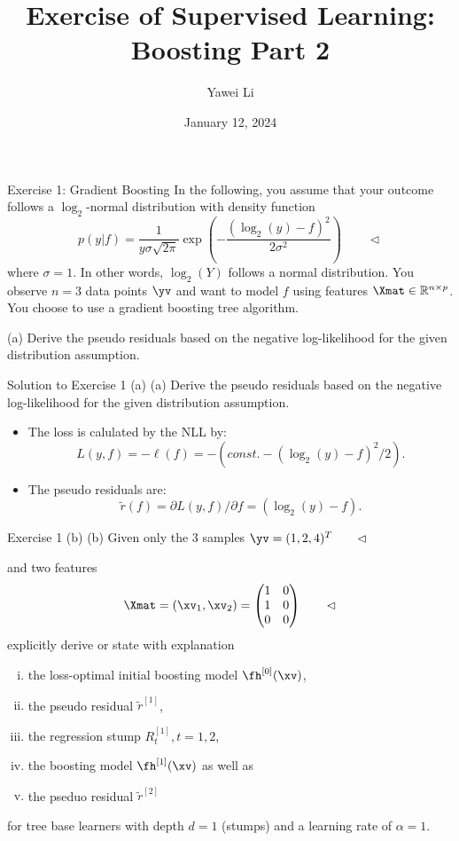\documentclass[aspectratio=169]{beamer}
\title[]{\textbf{Exercise of Supervised Learning: \\ Boosting Part 2}}
\author{Yawei Li}
\institute[LMU]
{
\\
  \texttt{yawei.li@stat.uni-muenchen.de}
}
\date{January 12, 2024}
\newcommand{\fhx}[1]{\fh^{[#1]}(\xv)}
\newcommand{\rtilde}[1]{\tilde{r}^{[#1]}}
\newcommand{\Rt}[1]{R_t^{[#1]}}
\begin{document}
\begin{frame}
\titlepage
\end{frame}

\begin{frame}{Exercise 1: Gradient Boosting}
	In the following, you assume that your outcome follows a $\log_2$-normal distribution with density function 
	$$p(y|f) = \frac{1}{y \sigma \sqrt{2\pi}} \exp\left( - \frac{(\log_2(y) - f)^2}{2\sigma^2} \right) \qquad \lhd$$ 
	where $\sigma = 1$. In other words, $\log_2(Y)$ follows a normal distribution. You observe $n = 3$ data points $\yv$ and want to model $f$ using features $\Xmat \in \mathbb{R}^{n \times p}$. You choose to use a gradient boosting tree algorithm. 
	
	(a) Derive the pseudo residuals based on the negative log-likelihood for the given distribution assumption.
\end{frame}

\begin{frame}{Solution to Exercise 1 (a)}
	(a) Derive the pseudo residuals based on the negative log-likelihood for the given distribution assumption.
	\begin{itemize}
		\item<2-> The loss is calulated by the NLL by: $$L(y, f) = - \ell(f) = - (const. - (\log_2(y) - f)^2 /2).$$
		\item<3-> The pseudo residuals are: $$\tilde{r} (f) = \partial L(y,f) / \partial f = (\log_2(y) - f).$$
	\end{itemize}
\end{frame}

\begin{frame}{Exercise 1 (b)}
	(b) Given only the 3 samples $\yv = (1, 2, 4)^T \qquad \lhd$ 
	
	and two features 
	$$\Xmat = (\xv_1, \xv_2) = 
		\begin{pmatrix}
			1 & 0 \\
			1 & 0 \\
			0 & 0 \\
		\end{pmatrix} \qquad \lhd
	$$
	explicitly derive or state with explanation
	\begin{enumerate}[(i)]
		\item the loss-optimal initial boosting model $\fhx{0}$,
		\item the pseudo residual $\rtilde{1}$,
		\item the regression stump $\Rt{1}, t = 1, 2$,
		\item the boosting model $\fhx{1}$ as well as 
		\item the pseduo residual $\rtilde{2}$
	\end{enumerate}
	for tree base learners with depth $d = 1$ (stumps) and a learning rate of $\alpha = 1$. 
\end{frame}
\end{document}
